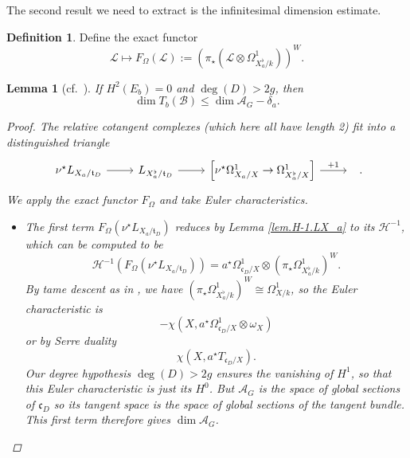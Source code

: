 \documentclass[openany]{amsbook}
\newtheorem{lemma}[theorem]{Lemma}
\theoremstyle{definition}
\newtheorem{definition}[theorem]{Definition}
\theoremstyle{remark}
\numberwithin{equation}{section}
\newcommand{\cH}{\mathcal{H}}
\newcommand{\cA}{\mathcal{A}}
\newcommand{\cL}{\mathcal{L}}
\newcommand{\cB}{\mathcal{B}}
\renewcommand{\-}{\operatorname{-}}
\newcommand{\ft}{\mathfrak{t}}
\newcommand{\fc}{\mathfrak{c}}
\begin{document}
The second result we need to extract is the infinitesimal dimension estimate.

\begin{definition}
    Define the exact functor
    $$
        \cL \mapsto F_\Omega(\cL) := (\pi_\star(\cL \otimes \Omega^1_{X_a^\flat/k}))^W.
    $$
\end{definition}

\begin{lemma}[{cf.\ \cite[Lemme 9.9.1]{CLII}}]\label{lem.dim.est.cB}
    If $H^2(E_b) = 0$ and $\deg(D) > 2g$, then
    $$
        \dim T_b(\cB) \le \dim \cA_G - \delta_a.
    $$
    \begin{proof}
        The relative cotangent complexes (which here all have length 2) fit into a distinguished triangle
        $$
            \begin{tikzcd}[ampersand replacement=\&]
                \nu^\star L_{X_a/\ft_D} \ar[r] \& L_{X_a^\flat/\ft_D} \ar[r] \& \left[ \nu^\star \Omega^1_{X_a/X} \to \Omega^1_{X_a^\flat/X}\right] \ar[r, "+1"] \& \;
            \end{tikzcd}.
        $$
        We apply the exact functor $F_{\Omega}$ and take Euler characteristics. 
        \begin{itemize}
            \item The first term $F_{\Omega}(\nu^\star L_{X_a/\ft_D})$ reduces by Lemma \ref{lem.H-1.LX_a} to its $\cH^{-1}$, which can be computed to be
            $$
                \cH^{-1}(F_{\Omega}(\nu^\star L_{X_a/\ft_D})) = a^\star \Omega^1_{\fc_D/X} \otimes (\pi_\star \Omega^1_{X_a^\flat/k})^W.
            $$
            By tame descent as in \cite[Lemme 9.11.1(2)]{CLII}, we have $(\pi_\star \Omega^1_{X_a^\flat/k})^W \cong \Omega^1_{X/k}$, so the Euler characteristic is 
            $$
                - \chi(X, a^\star \Omega^1_{\fc_D/X} \otimes \omega_X)
            $$
            or by Serre duality
            $$
                \chi(X, a^\star T_{\fc_D/X}).
            $$
            Our degree hypothesis $\deg(D) > 2g$ ensures the vanishing of $H^1$, so that this Euler characteristic is just its $H^0$. But $\cA_G$ is the space of global sections of $\fc_D$ so its tangent space is the space of global sections of the tangent bundle. This first term therefore gives $\dim \cA_G$.


\end{itemize}
\end{proof}
\end{lemma}
\end{document}
